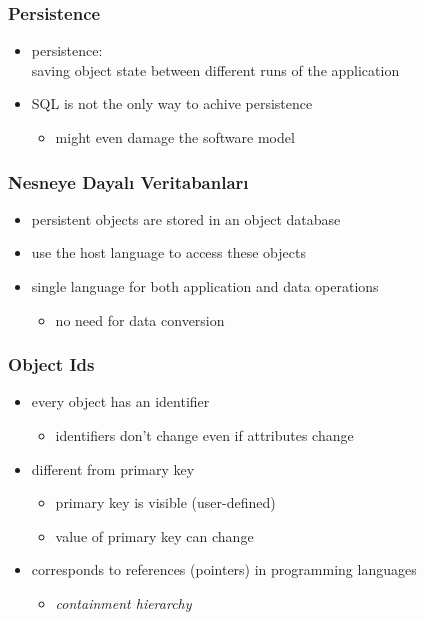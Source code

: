 \documentclass[dvipsnames]{beamer}
\theoremstyle{plain}
\begin{document}
\begin{frame}
  \frametitle{Persistence}

  \begin{itemize}
    \item \alert{persistence}:\\
      saving object state between different runs of the application

    \pause
    \medskip
    \item SQL is not the only way to achive persistence
    \begin{itemize}
      \item might even damage the software model
    \end{itemize}
  \end{itemize}
\end{frame}

\begin{frame}
  \frametitle{Nesneye Dayalı Veritabanları}

  \begin{itemize}
    \item persistent objects are stored in an object database
    \item use the host language to access these objects

    \pause
    \item single language for both application and data operations
    \begin{itemize}
      \item no need for data conversion
    \end{itemize}
  \end{itemize}
\end{frame}

\begin{frame}
  \frametitle{Object Ids}

  \begin{itemize}
    \item every object has an identifier
    \begin{itemize}
      \item identifiers don't change even if attributes change
    \end{itemize}

    \pause
    \item different from primary key
    \begin{itemize}
      \item primary key is visible (user-defined)
      \item value of primary key can change
    \end{itemize}

    \pause
    \item corresponds to references (pointers) in programming languages
    \begin{itemize}
      \item \emph{containment hierarchy}
    \end{itemize}
  \end{itemize}
\end{frame}
\end{document}
